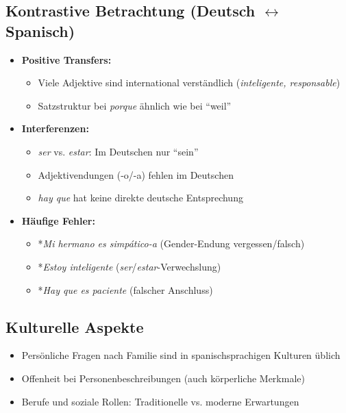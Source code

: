 \documentclass[11pt,a4paper]{article}
\begin{document}
\subsection{Kontrastive Betrachtung (Deutsch $\leftrightarrow$ Spanisch)}
\begin{itemize}
    \item \textbf{Positive Transfers:}
    \begin{itemize}
        \item Viele Adjektive sind international verständlich (\textit{inteligente, responsable})
        \item Satzstruktur bei \textit{porque} ähnlich wie bei ``weil''
    \end{itemize}

    \item \textbf{Interferenzen:}
    \begin{itemize}
        \item \textit{ser} vs. \textit{estar}: Im Deutschen nur ``sein''
        \item Adjektivendungen (-o/-a) fehlen im Deutschen
        \item \textit{hay que} hat keine direkte deutsche Entsprechung
    \end{itemize}

    \item \textbf{Häufige Fehler:}
    \begin{itemize}
        \item *\textit{Mi hermano es simpático-a} (Gender-Endung vergessen/falsch)
        \item *\textit{Estoy inteligente} (\textit{ser}/\textit{estar}-Verwechslung)
        \item *\textit{Hay que es paciente} (falscher Anschluss)
    \end{itemize}
\end{itemize}

\subsection{Kulturelle Aspekte}
\begin{itemize}
    \item Persönliche Fragen nach Familie sind in spanischsprachigen Kulturen üblich
    \item Offenheit bei Personenbeschreibungen (auch körperliche Merkmale)
    \item Berufe und soziale Rollen: Traditionelle vs. moderne Erwartungen
\end{itemize}
\end{document}
